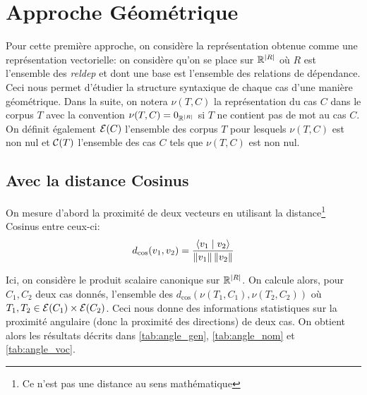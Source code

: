 \documentclass{cours}
\begin{document}
\section{Approche Géométrique}\label{sec:géométrie}
Pour cette première approche, on considère la représentation obtenue comme une représentation vectorielle: on considère qu'on se place sur $\mathbb{R}^{\left|R\right|}$ où $R$ est l'ensemble des \textit{reldep} et dont une base est l'ensemble des relations de dépendance.
Ceci nous permet d'étudier la structure syntaxique de chaque cas d'une manière géométrique.
Dans la suite, on notera $\nu(T, C)$ la représentation du cas $C$ dans le corpus $T$ avec la convention $\nu(T, C) = 0_{\mathbb{R}^{\left|R\right|}}$ si $T$ ne contient pas de mot au cas $C$.
On définit également $\mathcal{E}(C)$ l'ensemble des corpus $T$ pour lesquels $\nu(T, C)$ est non nul et $\mathcal{C}(T)$ l'ensemble des cas $C$ tels que $\nu(T, C)$ est non nul.

\subsection{Avec la distance Cosinus}\label{subsec:cosinus}
On mesure d'abord la proximité de deux vecteurs en utilisant la distance\footnote{Ce n'est pas une distance au sens mathématique} Cosinus entre ceux-ci:
\begin{equation}
	d_{\cos}(v_{1},v_{2}) = \frac{\left\langle v_{1}\mid v_{2} \right\rangle}{\left\lVert v_{1} \right\rVert\left\lVert v_{2} \right\rVert}
\end{equation}

Ici, on considère le produit scalaire canonique sur $\mathbb{R}^{\left|R\right|}$.
On calcule alors, pour $C_{1}, C_{2}$ deux cas donnés, l'ensemble des $d_{\cos}\left(\nu\left(T_{1}, C_{1}\right), \nu\left(T_{2}, C_{2}\right)\right)$ où $T_{1}, T_{2} \in \mathcal{E}(C_{1})\times \mathcal{E}(C_{2})$.
Ceci nous donne des informations statistiques sur la proximité angulaire (donc la proximité des directions) de deux cas.
On obtient alors les résultats décrits dans \ref{tab:angle_gen}, \ref{tab:angle_nom} et \ref{tab:angle_voc}.
\end{document}
